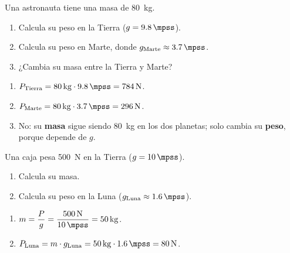 \begin{exercise}
    Una astronauta tiene una masa de \qty{80}{\kg}.
    \begin{enumerate}[label=\letraminuscula]
        \item Calcula su peso en la Tierra (\(g=\qty{9.8}{\mpss}\)).
        \item Calcula su peso en Marte, donde \(g_{\text{Marte}} \approx \qty{3.7}{\mpss}\).
        \item ¿Cambia su masa entre la Tierra y Marte?
    \end{enumerate}
    \begin{solu}
        \begin{enumerate}[label=\alph*)]
            \item \(P_{\text{Tierra}} = \qty{80}{\kg} \cdot \qty{9.8}{\mpss} = \qty{784}{\newton}\).
            \item \(P_{\text{Marte}} = \qty{80}{\kg} \cdot \qty{3.7}{\mpss} = \qty{296}{\newton}\).
            \item No: su \textbf{masa} sigue siendo \qty{80}{\kg} en los dos planetas; solo cambia su \textbf{peso}, porque depende de \(g\).
        \end{enumerate}
    \end{solu}
\end{exercise}

\begin{exercise}
    Una caja pesa \qty{500}{\newton} en la Tierra (\(g=\qty{10}{\mpss}\)).
    \begin{enumerate}[label=\letraminuscula]
        \item Calcula su masa.
        \item Calcula su peso en la Luna (\(g_{\text{Luna}} \approx \qty{1.6}{\mpss}\)).
    \end{enumerate}
    \begin{solu}
        \begin{enumerate}[label=\alph*)]
            \item \(m = \dfrac{P}{g} = \dfrac{\qty{500}{\newton}}{\qty{10}{\mpss}} = \qty{50}{\kg}\).
            \item \(P_{\text{Luna}} = m \cdot g_{\text{Luna}} = \qty{50}{\kg} \cdot \qty{1.6}{\mpss} = \qty{80}{\newton}\).
        \end{enumerate}
    \end{solu}
\end{exercise}

